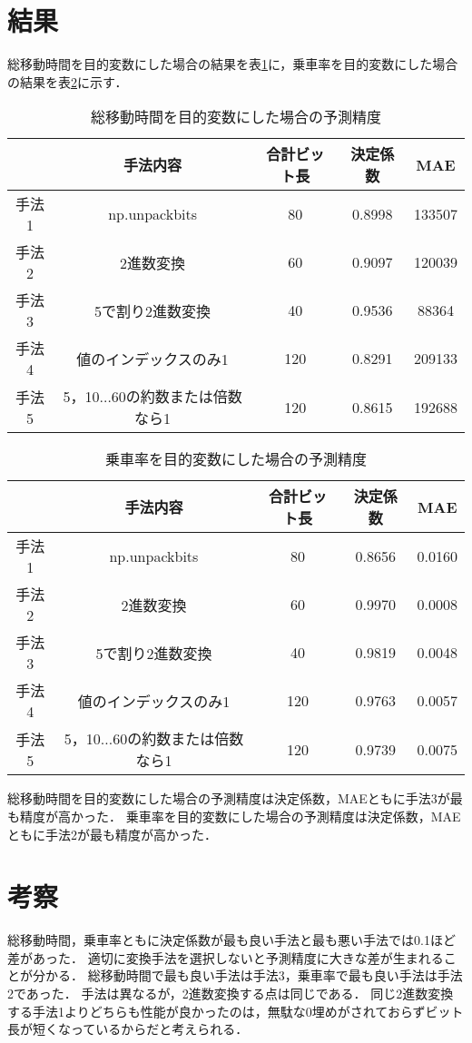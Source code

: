 \documentclass[main]{subfiles}
\begin{document}
    \section{結果}
    総移動時間を目的変数にした場合の結果を表\ref{bit_1}に，乗車率を目的変数にした場合の結果を表\ref{bit_2}に示す．
    \begin{table}[h]
        \centering
        \caption{総移動時間を目的変数にした場合の予測精度}
        \begin{tabular}{c|cccc}
           & 手法内容 & 合計ビット長 & 決定係数 & MAE \\ \hline
          手法1 & np.unpackbits & 80 & 0.8998 & 133507 \\
          手法2 & 2進数変換 & 60 & 0.9097 & 120039 \\
          手法3 & 5で割り2進数変換 & 40 & 0.9536 & 88364 \\
          手法4 & 値のインデックスのみ1 & 120 & 0.8291 & 209133 \\
          手法5 & 5，10$\dots$60の約数または倍数なら1 & 120 & 0.8615 & 192688 \\
        \end{tabular}
        \label{bit_1}
    \end{table}
    \begin{table}[h]
        \centering
        \caption{乗車率を目的変数にした場合の予測精度}
        \begin{tabular}{c|cccc}
           & 手法内容 & 合計ビット長 & 決定係数 & MAE \\ \hline
          手法1 & np.unpackbits & 80 & 0.8656 & 0.0160 \\
          手法2 & 2進数変換 & 60 & 0.9970 & 0.0008 \\
          手法3 & 5で割り2進数変換 & 40 & 0.9819 & 0.0048 \\
          手法4 & 値のインデックスのみ1 & 120 & 0.9763 & 0.0057 \\
          手法5 & 5，10$\dots$60の約数または倍数なら1 & 120 & 0.9739 & 0.0075 \\
        \end{tabular}
        \label{bit_2}
    \end{table}
    総移動時間を目的変数にした場合の予測精度は決定係数，MAEともに手法3が最も精度が高かった．
    乗車率を目的変数にした場合の予測精度は決定係数，MAEともに手法2が最も精度が高かった．
    \section{考察}
    総移動時間，乗車率ともに決定係数が最も良い手法と最も悪い手法では0.1ほど差があった．
    適切に変換手法を選択しないと予測精度に大きな差が生まれることが分かる．
    総移動時間で最も良い手法は手法3，乗車率で最も良い手法は手法2であった．
    手法は異なるが，2進数変換する点は同じである．
    同じ2進数変換する手法1よりどちらも性能が良かったのは，無駄な0埋めがされておらずビット長が短くなっているからだと考えられる．
    
\end{document}

